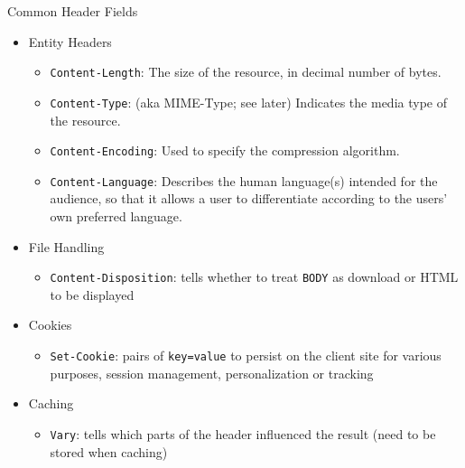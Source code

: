 \begin{frame}{Common Header Fields}
%
\begin{itemize}
\item Entity Headers
	\begin{itemize}
	\item \texttt{Content-Length}: The size of the resource, in decimal number of bytes.
	\item \texttt{Content-Type}: (aka MIME-Type; see later) Indicates the media type of the resource.
	\item \texttt{Content-Encoding}: Used to specify the compression algorithm.
	\item \texttt{Content-Language}: Describes the human language(s) intended for the audience, so that it allows a user to differentiate according to the users' own preferred language.
	\end{itemize}
\item File Handling
	\begin{itemize}
	\item \texttt{Content-Disposition}: tells whether to treat \texttt{BODY} as download or HTML to be displayed
	\end{itemize}
\item Cookies
	\begin{itemize}
	\item \texttt{Set-Cookie}: pairs of \texttt{key=value} to persist on the client site for various purposes, \zB session management, personalization or tracking
	\end{itemize}
\item Caching
	\begin{itemize}
	\item \texttt{Vary}: tells which parts of the header influenced the result (\ie need to be stored when caching)
	\end{itemize}
\end{itemize}
%
%
\end{frame}



